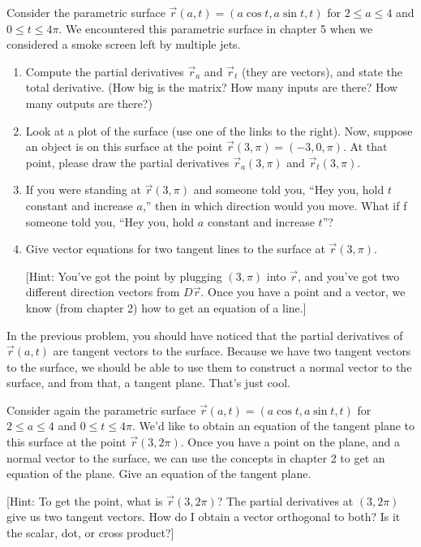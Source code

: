 \begin{problem}
 Consider the parametric surface $\vec r(a,t) = (a\cos t, a\sin t, t)$ for $2\leq a\leq 4$ and $0\leq t\leq 4\pi$. We encountered this parametric surface in chapter 5 when we considered a smoke screen left by multiple jets.
\begin{enumerate}
 \item Compute the partial derivatives $\vec r_a$ and $\vec r_t$ (they are vectors), and state the total derivative. (How big is the matrix? How many inputs are there? How many outputs are there?)
 \item {}%
Look at a plot of the surface (use one of the links to the right). Now, suppose an object is on this surface at the point $\vec r(3,\pi) = (-3,0,\pi)$. At that point, please draw the partial derivatives $\vec r_a(3,\pi)$ and $\vec r_t(3,\pi)$.  
 \item If you were standing at $\vec r(3,\pi)$ and someone told you, ``Hey you, hold $t$ constant and increase $a$,'' then in which direction would you move. What if f someone told you, ``Hey you, hold $a$ constant and increase $t$''?
 \item Give vector equations for two tangent lines to the surface at $\vec r(3,\pi)$. 

[Hint: You've got the point by plugging $(3,\pi)$ into $\vec r$, and you've got two different direction vectors from $D\vec r$. Once you have a point and a vector, we know (from chapter 2) how to get an equation of a line.]
\end{enumerate}
  
\end{problem}

In the previous problem, you should have noticed that the partial derivatives of $\vec r(a,t)$ are tangent vectors to the surface. Because we have two tangent vectors to the surface, we should be able to use them to construct a normal vector to the surface, and from that, a tangent plane. That's just cool.

\begin{problem}
 Consider again the parametric surface $\vec r(a,t) = (a\cos t, a\sin t, t)$ for $2\leq a\leq 4$ and $0\leq t\leq 4\pi$. 
 We'd like to obtain an equation of the tangent plane to this surface at the point $\vec r(3,2\pi)$. Once you have a point on the plane, and a normal vector to the surface, we can use the concepts in chapter 2 to get an equation of the plane. Give an equation of the tangent plane.

 [Hint: To get the point, what is $\vec r(3,2\pi)$? The partial derivatives at $(3,2\pi)$ give us two tangent vectors.  How do I obtain a vector orthogonal to both? Is it the scalar, dot, or cross product?]
\end{problem}



